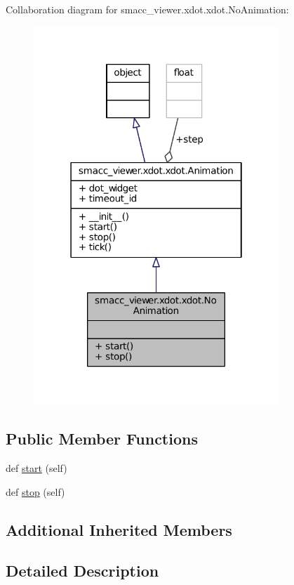 Collaboration diagram for smacc\+\_\+viewer.\+xdot.\+xdot.\+No\+Animation\+:
\nopagebreak
\begin{figure}[H]
\begin{center}
\leavevmode
\includegraphics[width=262pt]{classsmacc__viewer_1_1xdot_1_1xdot_1_1NoAnimation__coll__graph}
\end{center}
\end{figure}
\subsection*{Public Member Functions}
\begin{DoxyCompactItemize}
\item 
def \hyperlink{classsmacc__viewer_1_1xdot_1_1xdot_1_1NoAnimation_af6eb1863e884f0b1ca46a16973705bd9}{start} (self)
\item 
def \hyperlink{classsmacc__viewer_1_1xdot_1_1xdot_1_1NoAnimation_ad9d904d2553b809b004fd19c2619a1f2}{stop} (self)
\end{DoxyCompactItemize}
\subsection*{Additional Inherited Members}


\subsection{Detailed Description}


